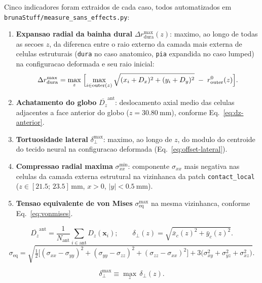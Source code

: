 Cinco indicadores foram extraidos de cada caso, todos automatizados em \texttt{brunaStuff/measure\_sans\_effects.py}:
%
\begin{enumerate}
  \item \textbf{Expansao radial da bainha dural} $\Delta r_{\mathrm{dura}}^{\max}(z)$: maximo, ao longo de todas as secoes $z$, da diferenca entre o raio externo da camada mais externa de celulas estruturais (\texttt{dura} no caso anatomico, \texttt{pia} expandida no caso lumped) na configuracao deformada e seu raio inicial:
  \begin{equation}
    \Delta r_{\mathrm{dura}}^{\max} = \max_{z}\;\Bigl[ \max_{i \in \mathrm{outer}(z)} \sqrt{(x_i + D_x)^2 + (y_i + D_y)^2} \;-\; r_{\mathrm{outer}}^0(z) \Bigr].
    \label{eq:dr-max}
  \end{equation}
  \item \textbf{Achatamento do globo} $\overline{D_z}^{\mathrm{ant}}$: deslocamento axial medio das celulas adjacentes a face anterior do globo ($z = \SI{30.80}{\milli\meter}$), conforme Eq.~\ref{eq:dz-anterior}.
  \item \textbf{Tortuosidade lateral} $\delta_{\perp}^{\max}$: maximo, ao longo de $z$, do modulo do centroide do tecido neural na configuracao deformada (Eq.~\ref{eq:offset-lateral}).
  \item \textbf{Compressao radial maxima} $\sigma_{xx}^{\min}$: componente $\sigma_{xx}$ mais negativa nas celulas da camada externa estrutural na vizinhanca da patch \texttt{contact\_local} ($z \in [21.5;\, 23.5]\,\si{\milli\meter}$, $x > 0$, $|y| < \SI{0.5}{\milli\meter}$).
  \item \textbf{Tensao equivalente de von Mises} $\sigma_{\mathrm{eq}}^{\max}$ na mesma vizinhanca, conforme Eq.~\ref{eq:vonmises}.
\end{enumerate}

\begin{equation}
  \overline{D_z}^{\mathrm{ant}} = \frac{1}{N_{\mathrm{ant}}} \sum_{i \in \mathrm{ant}} D_z(\mathbf{x}_i);\qquad \delta_{\perp}(z) = \sqrt{\bar x_c(z)^2 + \bar y_c(z)^2}.
  \label{eq:dz-anterior}
\end{equation}
%
\begin{equation}
  \sigma_{\mathrm{eq}} = \sqrt{\tfrac{1}{2}\bigl[(\sigma_{xx}-\sigma_{yy})^2+(\sigma_{yy}-\sigma_{zz})^2+(\sigma_{zz}-\sigma_{xx})^2\bigr] + 3\bigl(\sigma_{xy}^2 + \sigma_{yz}^2 + \sigma_{xz}^2\bigr)}.
  \label{eq:vonmises}
\end{equation}

\begin{equation}
  \delta_{\perp}^{\max} \equiv \max_{z}\,\delta_{\perp}(z).
  \label{eq:offset-lateral}
\end{equation}

